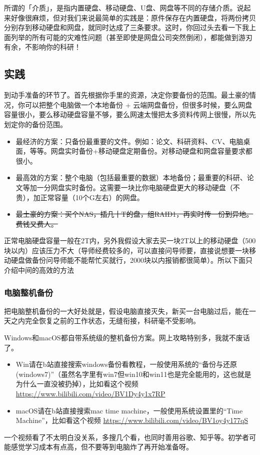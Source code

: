 所谓的「介质」，是指内置硬盘、移动硬盘、U盘、网盘等不同的存储介质。说起来好像很麻烦，但对我们来说最简单的实践是：原件保存在内置硬盘，将两份拷贝分别存到移动硬盘和网盘，就同时达成了三条要求。这时，你回过头去看一下我上面列举的所有可能的灾难性问题（甚至即使是网盘公司突然倒闭），都能做到游刃有余，不影响你的科研！

\subsection{实践}

到动手准备的环节了。首先根据你手里的资源，决定你要备份的范围。最土豪的情况，你可以把整个电脑做一个本地备份 + 云端网盘备份，但很多时候，要么网盘容量很小，要么移动硬盘容量不够，要么网速太慢把太多资料传网上很慢，所以先划定你的备份范围。

\begin{itemize}
    \item 最经济的方案：只备份最重要的文件。例如：论文、科研资料、CV、电脑桌面，等等。网盘实时备份+移动硬盘定期备份。对移动硬盘和网盘容量要求都很小。
    \item 最高效的方案：整个电脑（包括最重要的数据）本地备份；最重要的科研、论文等加一分网盘实时备份。这需要一块比你电脑硬盘更大的移动硬盘（不贵），加正常容量（10个G左右）的网盘。
    \item \sout{最土豪的方案：买个NAS，插几十T的盘，组RAID1，再实时传一份到异地。费钱又费人。}
\end{itemize}

正常电脑硬盘容量一般在2T内，另外我假设大家去买一块2T以上的移动硬盘（500块以内）应该压力不大（导师经费较多的，可以直接问导师要，直接说想要一块移动硬盘做备份问导师能不能帮忙买就行，2000块以内报销都很简单）。所以下面只介绍中间的高效的方法

\subsubsection{电脑整机备份}

把电脑整机备份的一大好处就是，假设电脑直接灭失，新买一台电脑过后，能在一天之内完全恢复之前的工作状态，无缝衔接，科研毫不受影响。

Windows和macOS都自带系统级的整机备份方案。网上攻略特别多，我就不废话了。
\begin{itemize}
    \item Win请在b站直接搜索windows备份看教程，一般使用系统的“备份与还原(windows7)”（虽然名字里有win7但win10和win11也是完全能用的，这也就是为什么一直没被扔掉），比如看这个视频 \url{https://www.bilibili.com/video/BV1Dy4y1x7RP}
    \item macOS请在b站直接搜索mac time machine，一般使用系统设置里的“Time Machine”，比如看这个视频 \url{https://www.bilibili.com/video/BV1oy4y177qS}
\end{itemize}
一个视频看了不太明白没关系，多搜几个看，也同时善用谷歌、知乎等。初学者可能感觉学习成本有点高，但不要等到电脑炸了再开始准备呀。

